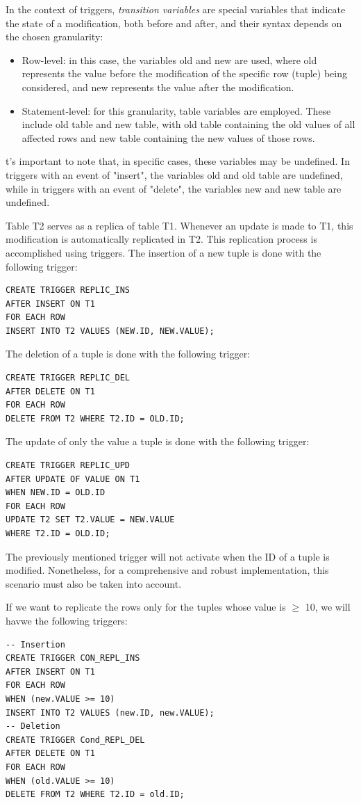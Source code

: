 \begin{definition}
    In the context of triggers, \emph{transition variables} are special variables that indicate the state of a modification, both before and after, and their syntax depends on the chosen granularity:
    \begin{itemize}
        \item Row-level: in this case, the variables old and new are used, where old represents the value before the modification of the specific row (tuple) being considered, and new represents the value after the modification.
        \item Statement-level: for this granularity, table variables are employed. 
            These include old table and new table, with old table containing the old values of all affected rows and new table containing the new values of those rows.
    \end{itemize}
\end{definition}
t's important to note that, in specific cases, these variables may be undefined. 
In triggers with an event of "insert", the variables old and old table are undefined, while in triggers with an event of "delete", the variables new and new table are undefined.  
\begin{example}
    Table T2 serves as a replica of table T1. 
    Whenever an update is made to T1, this modification is automatically replicated in T2. 
    This replication process is accomplished using triggers.
    The insertion of a new tuple is done with the following trigger: 
    \begin{lstlisting}[style=SQL]
CREATE TRIGGER REPLIC_INS
AFTER INSERT ON T1
FOR EACH ROW
INSERT INTO T2 VALUES (NEW.ID, NEW.VALUE);
    \end{lstlisting}
    The deletion of a tuple is done with the following trigger: 
    \begin{lstlisting}[style=SQL]
CREATE TRIGGER REPLIC_DEL
AFTER DELETE ON T1
FOR EACH ROW
DELETE FROM T2 WHERE T2.ID = OLD.ID;
    \end{lstlisting}
    The update of only the value a tuple is done with the following trigger: 
    \begin{lstlisting}[style=SQL]
CREATE TRIGGER REPLIC_UPD
AFTER UPDATE OF VALUE ON T1
WHEN NEW.ID = OLD.ID
FOR EACH ROW
UPDATE T2 SET T2.VALUE = NEW.VALUE
WHERE T2.ID = OLD.ID;
    \end{lstlisting}
    The previously mentioned trigger will not activate when the ID of a tuple is modified. 
    Nonetheless, for a comprehensive and robust implementation, this scenario must also be taken into account.

    If we want to replicate the rows only for the tuples whose value is $\geq$ 10, we will havwe the following triggers: 
    \begin{lstlisting}[style=SQL]
-- Insertion
CREATE TRIGGER CON_REPL_INS
AFTER INSERT ON T1
FOR EACH ROW
WHEN (new.VALUE >= 10)
INSERT INTO T2 VALUES (new.ID, new.VALUE);
-- Deletion
CREATE TRIGGER Cond_REPL_DEL
AFTER DELETE ON T1
FOR EACH ROW
WHEN (old.VALUE >= 10)
DELETE FROM T2 WHERE T2.ID = old.ID;
    \end{lstlisting}
\end{example}
